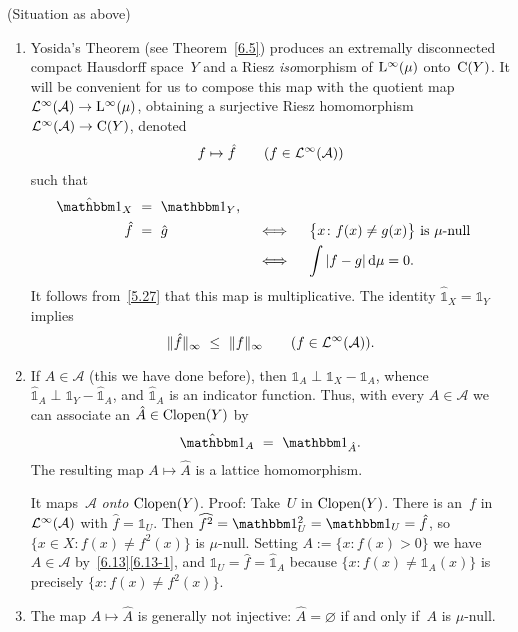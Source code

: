 \documentclass[main.tex]{subfiles}
\begin{document}
\begin{psec}{6.20}%
(Situation as above)
\begin{enumerate}
\item\label{6.20-1}
Yosida's Theorem (see Theorem~\ref{6.5})
produces an extremally disconnected compact Hausdorff space~$Y$
and a Riesz \emph{iso}morphism
of $\mathrm{L}^\infty(\mu)$ onto~$\mathrm{C}(Y)$.
It will be convenient for us
to compose this map with the quotient map
$\mathcal{L}^\infty(\mathcal A)\rightarrow \mathrm{L}^\infty(\mu)$,
obtaining a surjective Riesz homomorphism
$\mathcal{L}^\infty(\mathcal A)\rightarrow\mathrm{C}(Y)$,
denoted
\begin{equation*}
f\mapsto \hat{f}\qquad(f\in\mathcal{L}^\infty(\mathcal A))
\end{equation*}
such that
\begin{alignat*}{2}
\hat{\mathbb{1}}_X\ &=\ \mathbb{1}_Y\htam{,} \\
\hat f \ &=\ \hat g\quad&
&\iff\quad \bigl\{x\colon f(x)\neq g(x)\bigr\}\htam{ is }\mu\htam{-null} \\
&&&\iff\quad \int |f-g|\,\mathrm{d}\mu = 0\htam{.}
\end{alignat*}
It follows from~\ref{5.27}
that this map is multiplicative.
The identity $\hat{\mathbb{1}}_X=\mathbb{1}_Y$ implies
\begin{equation*}
\|\hat{f}\|_\infty\ \leq\ \|f\|_\infty\qquad (f\in\BLeb(\mathcal A))\htam{.}
\end{equation*}
%
\item\label{6.20-2}
If $A\in\mathcal A$
(this we have done before),
then $\mathbb{1}_A \perp \mathbb{1}_X -\mathbb{1}_A$,
whence $\hat{\mathbb{1}}_A \perp \mathbb{1}_Y - \hat{\mathbb{1}}_A$,
and $\hat{\mathbb{1}}_A$ is an indicator function.
Thus,
with every $A\in\mathcal A$
we can associate an $\hat{A}\in\mathrm{Clopen}(Y)$ by
\begin{equation*}
\hat{\mathbb 1}_A\ =\ \mathbb{1}_{\hat A}\htam{.}
\end{equation*}
The resulting map $A\mapsto \hat{A}$ is a lattice homomorphism.

It maps~$\mathcal A$ \emph{onto} $\mathrm{Clopen}(Y)$.
Proof:
Take~$U$ in $\mathrm{Clopen}(Y)$.
There is an~$f$ in~$\mathcal{L}^\infty(\mathcal A)$
with $\hat f=\mathbb{1}_U$.
Then $\smash{\widehat{f^2}}=\mathbb{1}_U^2=\mathbb{1}_U=\hat f$,
so $\{x\in X\colon f(x)\neq f^2(x)\}$ is $\mu$-null.
Setting $A:=\{x\colon f(x)>0\}$
we have $A\in\mathcal A$ by~\ref{6.13}\ref{6.13-1},
and $\mathbb{1}_U = \hat f = \hat{\mathbb{1}}_A$
because $\{x\colon f(x)\neq \mathbb{1}_A(x)\}$
is precisely $\{x\colon f(x)\neq f^2(x)\}$.
%
\item\label{6.20-3}
The map $A\mapsto \hat A$ is generally not injective:
$\hat A=\varnothing$ if and only if~$A$ is $\mu$-null.


\end{enumerate}
\end{psec}
\end{document}
